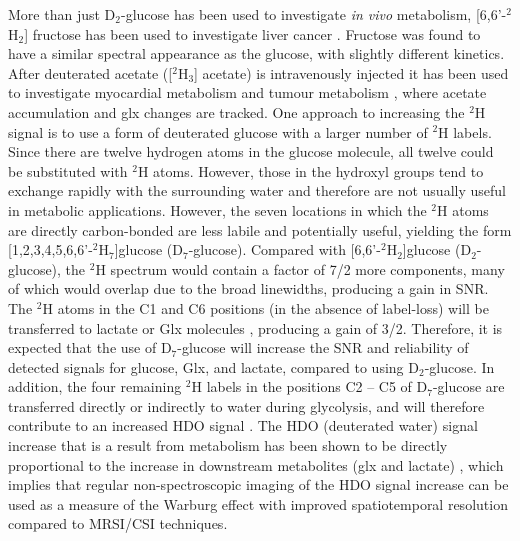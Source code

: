 More than just D$_2$-glucose has been used to investigate \textit{in vivo} metabolism, [6,6'-$^2$H$_2$] fructose has been used to investigate liver cancer \cite{Zhang202366-2H2Cancer}. Fructose was found to have a similar spectral appearance as the glucose, with slightly different kinetics. After deuterated acetate ([$^2$H$_3$] acetate) is intravenously injected it has been used to investigate myocardial metabolism \cite{Wang2021NoninvasiveImaging} and tumour metabolism \cite{DeFeyter2018DeuteriumVivo}, where acetate accumulation and glx changes are tracked. One approach to increasing the $^2$H signal is to use a form of deuterated glucose with a larger number of $^2$H labels. Since there are twelve hydrogen atoms in the glucose molecule, all twelve could be substituted with $^2$H atoms. However, those in the hydroxyl groups tend to exchange rapidly with the surrounding water and therefore are not usually useful in metabolic applications. However, the seven locations in which the $^2$H atoms are directly carbon-bonded are less labile and potentially useful, yielding the form [1,2,3,4,5,6,6'-$^2$H$_7$]glucose (D$_7$-glucose). Compared with [6,6'-$^2$H$_2$]glucose (D$_2$-glucose), the $^2$H spectrum would contain a factor of 7/2 more components, many of which would overlap due to the broad linewidths, producing a gain in \ac{SNR}. The $^2$H atoms in the C1 and C6 positions (in the absence of label-loss) will be transferred to lactate or Glx molecules \cite{DeFeyter2020DeuteriumBrain}, producing a gain of 3/2. Therefore, it is expected that the use of D$_7$-glucose will increase the \ac{SNR} and reliability of detected signals for glucose, Glx, and lactate, compared to using D$_2$-glucose. In addition, the four remaining $^2$H labels in the positions C2 – C5 of D$_7$-glucose are transferred directly or indirectly to water during glycolysis, and will therefore contribute to an increased \ac{HDO} signal \cite{Mahar2020HDOMetabolism, Mahar2021DeuteratedGlucose}. The \ac{HDO} (deuterated water) signal increase that is a result from metabolism has been shown to be directly proportional to the increase in downstream metabolites (glx and lactate) \cite{Mahar2021DeuteratedGlucose}, which implies that regular non-spectroscopic imaging of the \ac{HDO} signal increase can be used as a measure of the Warburg effect with improved spatiotemporal resolution compared to \ac{MRSI}/\ac{CSI} techniques. 

